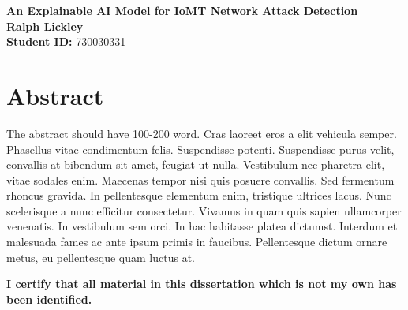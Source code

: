 \documentclass[11pt,a4paper]{article}
\begin{document}
\singlespacing  %
\thispagestyle{empty} %

\begin{center}
{\bf \LARGE An Explainable AI Model for IoMT Network Attack Detection}\\[0.5cm]
    \textbf{Ralph Lickley} \\[0.2cm]
    \textbf{Student ID:} 730030331 \\[1cm]
\end{center}

\section*{Abstract}

\noindent 
The abstract should have 100-200 word.
Cras laoreet eros a elit vehicula semper. Phasellus vitae condimentum felis. Suspendisse potenti. Suspendisse purus velit, convallis at bibendum sit amet, feugiat ut nulla. Vestibulum nec pharetra elit, vitae sodales enim. Maecenas tempor nisi quis posuere convallis. Sed fermentum rhoncus gravida. In pellentesque elementum enim, tristique ultrices lacus. Nunc scelerisque a nunc efficitur consectetur. Vivamus in quam quis sapien ullamcorper venenatis. In vestibulum sem orci. In hac habitasse platea dictumst. Interdum et malesuada fames ac ante ipsum primis in faucibus. Pellentesque dictum ornare metus, eu pellentesque quam luctus at. 

\vspace*{\fill}

\begin{checkbox}
    \item {\bf I certify that all material in this dissertation which is not my own has been identified.}
\end{checkbox}

\end{document}
